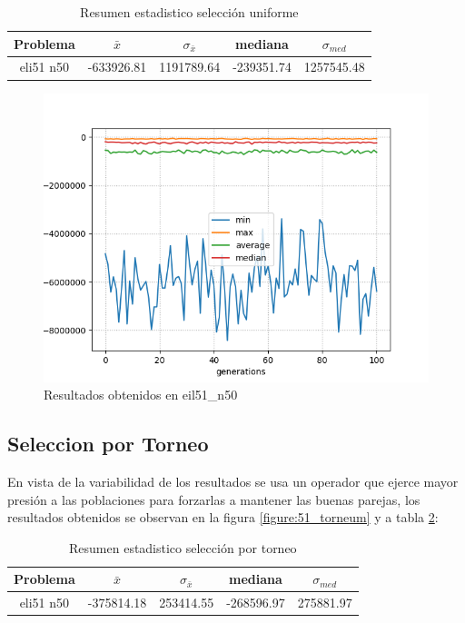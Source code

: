 \documentclass[twocolumn]{IEEEtran}
\begin{document}
\begin{table}[htpb]
    \centering
    \begin{tabular}{|c|c|c|c|c|}
        \hline
        Problema & $\bar{x}$ & $\sigma_{\bar{x}}$ & mediana & $\sigma_{med}$ \\
        \hline
        eli51 n50 & -633926.81 & 1191789.64 & -239351.74 & 1257545.48 \\
        \hline
    \end{tabular}
    \caption{Resumen estadistico selección uniforme}
    \label{table:results_rand}
\end{table}

\begin{figure}[htbp!]
    \centering
    \includegraphics[width=\linewidth]{figures/TTP_eil51_n50_random.png}
    \caption{Resultados obtenidos en eil51\_n50}
    \label{figure:51_random}
\end{figure}

\subsection{Seleccion por Torneo}
En vista de la variabilidad de los resultados se usa un operador que  ejerce mayor presión
a las poblaciones para forzarlas a mantener las buenas parejas, los resultados obtenidos se 
observan en la figura \ref{figure:51_torneum} y a tabla \ref{table:results_t}:

\begin{table}[htpb]
    \centering
    \begin{tabular}{|c|c|c|c|c|}
        \hline
        Problema & $\bar{x}$ & $\sigma_{\bar{x}}$ & mediana & $\sigma_{med}$ \\
        \hline
        eli51 n50 & -375814.18 & 253414.55 & -268596.97 & 275881.97 \\
        \hline
    \end{tabular}
    \caption{Resumen estadistico selección por torneo}
    \label{table:results_t}
\end{table}
\end{document}
